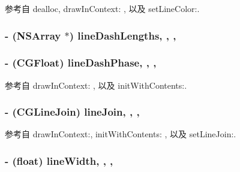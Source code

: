 参考自 dealloc, draw\-In\-Context\-: , 以及 set\-Line\-Color\-:.

\hypertarget{interface_r_m_path_ae3cb38856ea7fadfab64a740056404ea}{
\subsubsection[{line\-Dash\-Lengths}]{\setlength{\rightskip}{0pt plus 5cm}-\/ (N\-S\-Array $\ast$) line\-Dash\-Lengths\hspace{0.3cm}{\ttfamily [read]}, {\ttfamily [write]}, {\ttfamily [nonatomic]}, {\ttfamily [assign]}}}\label{interface_r_m_path_ae3cb38856ea7fadfab64a740056404ea}
\hypertarget{interface_r_m_path_a0280407af3e1d6d0b665af9d2d40ee2d}{
\subsubsection[{line\-Dash\-Phase}]{\setlength{\rightskip}{0pt plus 5cm}-\/ (C\-G\-Float) line\-Dash\-Phase\hspace{0.3cm}{\ttfamily [read]}, {\ttfamily [write]}, {\ttfamily [nonatomic]}, {\ttfamily [assign]}}}\label{interface_r_m_path_a0280407af3e1d6d0b665af9d2d40ee2d}


参考自 draw\-In\-Context\-: , 以及 init\-With\-Contents\-:.

\hypertarget{interface_r_m_path_a0418ed1c257890ec76454022b32a1077}{
\subsubsection[{line\-Join}]{\setlength{\rightskip}{0pt plus 5cm}-\/ (C\-G\-Line\-Join) line\-Join\hspace{0.3cm}{\ttfamily [read]}, {\ttfamily [write]}, {\ttfamily [nonatomic]}, {\ttfamily [assign]}}}\label{interface_r_m_path_a0418ed1c257890ec76454022b32a1077}


参考自 draw\-In\-Context\-:, init\-With\-Contents\-: , 以及 set\-Line\-Join\-:.

\hypertarget{interface_r_m_path_afe3c2bce6675d281fc86f60923b7b8e5}{
\subsubsection[{line\-Width}]{\setlength{\rightskip}{0pt plus 5cm}-\/ (float) line\-Width\hspace{0.3cm}{\ttfamily [read]}, {\ttfamily [write]}, {\ttfamily [nonatomic]}, {\ttfamily [assign]}}}\label{interface_r_m_path_afe3c2bce6675d281fc86f60923b7b8e5}


